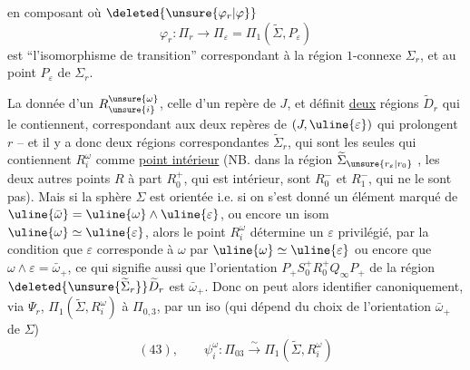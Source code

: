 en composant
où $\deleted{\unsure{\varphi_r|\varphi}}$
\[
\varphi_r:\Pi_r\longrightarrow\Pi_\varepsilon=\Pi_1(\widetilde\Sigma,P_\varepsilon)
\]
est ``l'isomorphisme de transition'' correspondant à la région $1$-connexe $\Sigma_r$, et au point $P_\varepsilon$ de $\Sigma_r$.

La donnée d'un $R_{\unsure{i}}^{\unsure{\omega}}$,  celle d'un repère  de $J$, et définit \uline{deux}  régions $\widetilde D_r$ qui le contiennent, correspondant aux deux repères de $(J,\uline{\varepsilon})$ qui prolongent $r$ -- et il y a donc deux régions correspondantes $\widetilde\Sigma_r$, qui sont les seules qui contiennent $R_i^\omega$ comme \uline{point intérieur} (NB. dans la région $\widetilde\Sigma_{\unsure{r_\varepsilon|r_0}}$ , les deux autres points $R$ à part $R_0^+$, qui est intérieur, sont $R_0^-$ et $R_1^-$, qui ne le sont pas). Mais si la sphère $\Sigma$ est orientée i.e. si on s'est donné un élément marqué \inserted{$\bar\omega_+$} de $\uline{\bar\omega}=\uline{\omega}\wedge\uline{\varepsilon}$, ou encore un isom $\uline{\omega}\simeq\uline{\varepsilon}$, alors le point $R_i^\omega$ détermine un $\varepsilon$ \inserted{$\in\uline{\varepsilon}$} privilégié, par la condition que $\varepsilon$ corresponde à $\omega$ par $\uline{\omega}\simeq\uline{\varepsilon}$ ou encore que $\omega\wedge\varepsilon=\bar\omega_+$, ce qui signifie aussi que l'orientation $P_+S_0^+R_0^+Q_\infty P_+$ de la région $\deleted{\unsure{\widetilde\Sigma_r}}\widetilde D_r$ est  $\bar\omega_+$. Donc on peut alors identifier canoniquement, via $\Psi_r$, $\Pi_1(\widetilde\Sigma,R_i^\omega)$ à $\Pi_{0,3}$, par un iso (qui dépend du choix de l'orientation $\bar\omega_+$ de $\Sigma$)
\[
(43),\qquad\psi_i^\omega:\Pi_{03}\xrightarrow{\sim}\Pi_1(\widetilde\Sigma,R_i^\omega)
\]

